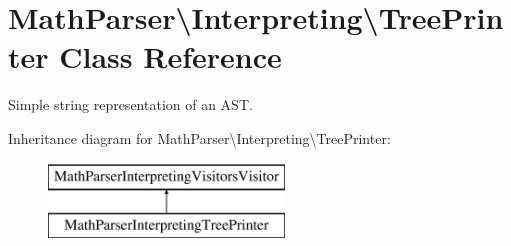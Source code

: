 \hypertarget{classMathParser_1_1Interpreting_1_1TreePrinter}{\section{Math\-Parser\textbackslash{}Interpreting\textbackslash{}Tree\-Printer Class Reference}
\label{classMathParser_1_1Interpreting_1_1TreePrinter}
}


Simple string representation of an A\-S\-T.  


Inheritance diagram for Math\-Parser\textbackslash{}Interpreting\textbackslash{}Tree\-Printer\-:\begin{figure}[H]
\begin{center}
\leavevmode
\includegraphics[height=2.000000cm]{classMathParser_1_1Interpreting_1_1TreePrinter}
\end{center}
\end{figure}

